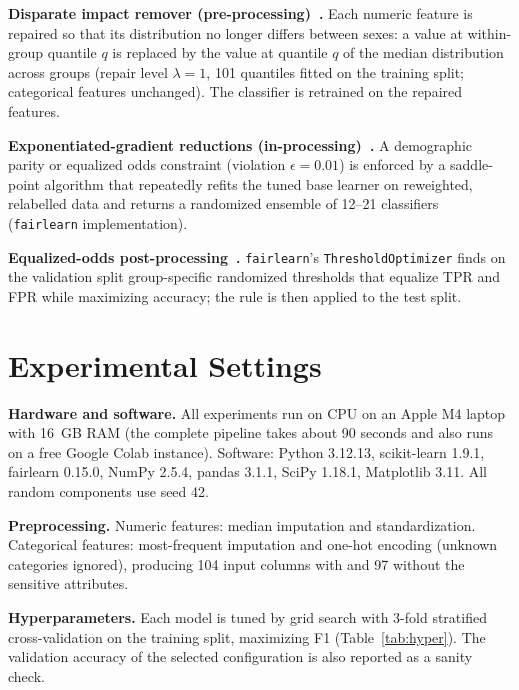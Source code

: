 \documentclass[conference]{IEEEtran}
\begin{document}
\textbf{Disparate impact remover (pre-processing)~\cite{feldman2015}.} Each numeric feature is repaired so that its distribution no longer differs between sexes: a value at within-group quantile $q$ is replaced by the value at quantile $q$ of the median distribution across groups (repair level $\lambda=1$, 101 quantiles fitted on the training split; categorical features unchanged). The classifier is retrained on the repaired features.

\textbf{Exponentiated-gradient reductions (in-processing)~\cite{agarwal2018}.} A demographic parity or equalized odds constraint (violation $\epsilon=0.01$) is enforced by a saddle-point algorithm that repeatedly refits the tuned base learner on reweighted, relabelled data and returns a randomized ensemble of 12--21 classifiers (\texttt{fairlearn} implementation).

\textbf{Equalized-odds post-processing~\cite{hardt2016}.} \texttt{fairlearn}'s \texttt{ThresholdOptimizer} finds on the validation split group-specific randomized thresholds that equalize TPR and FPR while maximizing accuracy; the rule is then applied to the test split.

\section{Experimental Settings}
\textbf{Hardware and software.} All experiments run on CPU on an Apple M4 laptop with 16~GB RAM (the complete pipeline takes about 90 seconds and also runs on a free Google Colab instance). Software: Python 3.12.13, scikit-learn 1.9.1, fairlearn 0.15.0, NumPy 2.5.4, pandas 3.1.1, SciPy 1.18.1, Matplotlib 3.11. All random components use seed 42.

\textbf{Preprocessing.} Numeric features: median imputation and standardization. Categorical features: most-frequent imputation and one-hot encoding (unknown categories ignored), producing 104 input columns with and 97 without the sensitive attributes.

\textbf{Hyperparameters.} Each model is tuned by grid search with 3-fold stratified cross-validation on the training split, maximizing F1 (Table~\ref{tab:hyper}). The validation accuracy of the selected configuration is also reported as a sanity check.
\end{document}
